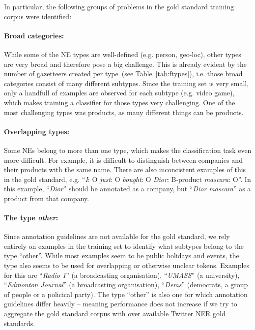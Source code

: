 \documentclass[11pt|a4paper]{article}
\begin{document}
In particular, the following groups of problems in the gold standard training corpus were identified:

\paragraph{Broad categories:} While some of the NE types are well-defined (e.g. person, geo-loc), other types are very broad and therefore pose a big challenge. This is already evident by the number of gazetteers created per type~(see Table~\ref{tab:ftypes}), i.e. those broad categories consist of many different subtypes. Since the training set is very small, only a handfull of examples are observed for each subtype (e.g. video game), which makes training a classifier for those types very challenging. One of the most challenging types was products, as many different things can be products.

\paragraph{Overlapping types:} Some NEs belong to more than one type, which makes the classification task even more difficult. For example, it is difficult to distinguish between companies and their products with the same name. There are also inconcistent examples of this in the gold standard, e.g. ``{\em I}: O {\em just}: O {\em bought}: O {\em Dior}: B-product {\em mascara}: O''. In this example, ``{\em Dior}'' should be annotated as a company, but ``{\em Dior mascara}'' as a product from that company.

\paragraph{The type \textit{other}:} Since annotation guidelines are not available for the gold standard, we rely entirely on examples in the training set to identify what subtypes belong to the type ``other''. While most examples seem to be public holidays and events, the type also seems to be used for overlapping or otherwise unclear tokens. Examples for this are ``{\em Radio 1}'' (a broadcasting organisation), ``{\em UMASS}'' (a university), ``{\em Edmonton Journal}'' (a broadcasting organisation), ``{\em Dems}'' (democrats, a group of people or a policical party). The type ``other'' is also one for which annotation guidelines differ heavily -- meaning performance does not increase if we try to aggregate the gold standard corpus with over available Twitter NER gold standards.
\end{document}
